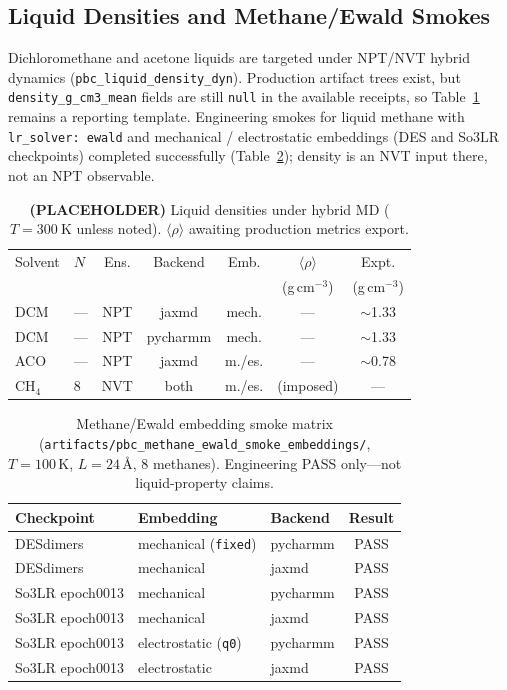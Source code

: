 \documentclass[journal=jctc,manuscript=article]{achemso}
\begin{document}
\subsection{Liquid Densities and Methane/Ewald Smokes}

Dichloromethane and acetone liquids are targeted under NPT/NVT hybrid dynamics
(\texttt{pbc\_liquid\_density\_dyn}). Production artifact trees exist, but
\texttt{density\_g\_cm3\_mean} fields are still \texttt{null} in the available
receipts, so Table~\ref{tab:density} remains a reporting template.
Engineering smokes for liquid methane with \texttt{lr\_solver: ewald} and
mechanical / electrostatic embeddings (DES and So3LR checkpoints) completed
successfully (Table~\ref{tab:methane-smoke}); density is an NVT input there, not
an NPT observable.

\begin{table}[h]
\caption{\textbf{(PLACEHOLDER)} Liquid densities under hybrid MD
(\(T=\SI{300}{\kelvin}\) unless noted). \(\langle\rho\rangle\) awaiting
production metrics export.}
\label{tab:density}
\footnotesize
\begin{tabular}{llccccc}
\toprule
Solvent & \(N\) & Ens. & Backend & Emb. & \(\langle\rho\rangle\) & Expt. \\
 & & & & & (g\,cm$^{-3}$) & (g\,cm$^{-3}$) \\
\midrule
DCM & --- & NPT & jaxmd & mech. & --- & \(\sim\)1.33 \\
DCM & --- & NPT & pycharmm & mech. & --- & \(\sim\)1.33 \\
ACO & --- & NPT & jaxmd & m./es. & --- & \(\sim\)0.78 \\
CH\(_4\) & 8 & NVT & both & m./es. & (imposed) & --- \\
\bottomrule
\end{tabular}
\end{table}

\begin{table}[h]
\caption{Methane/Ewald embedding smoke matrix
(\texttt{artifacts/pbc\_methane\_ewald\_smoke\_embeddings/}, \(T=100\,\mathrm{K}\),
\(L=24\,\si{\angstrom}\), 8 methanes). Engineering PASS only---not liquid-property
claims.}
\label{tab:methane-smoke}
\footnotesize
\begin{tabular}{lllc}
\toprule
Checkpoint & Embedding & Backend & Result \\
\midrule
DESdimers & mechanical (\texttt{fixed}) & pycharmm & PASS \\
DESdimers & mechanical & jaxmd & PASS \\
So3LR epoch0013 & mechanical & pycharmm & PASS \\
So3LR epoch0013 & mechanical & jaxmd & PASS \\
So3LR epoch0013 & electrostatic (\texttt{q0}) & pycharmm & PASS \\
So3LR epoch0013 & electrostatic & jaxmd & PASS \\
\bottomrule
\end{tabular}
\end{table}
\end{document}
